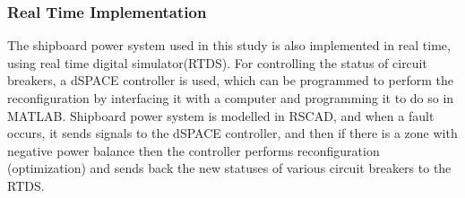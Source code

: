 \subsubsection{Real Time Implementation}
The shipboard power system used in this study is also implemented in real time, using real time digital simulator(RTDS). For controlling the status of circuit breakers, a dSPACE controller is used, which can be programmed to perform the reconfiguration by interfacing it with a computer and programming it to do so in MATLAB. Shipboard power system is modelled in RSCAD, and when a fault occurs, it sends signals to the dSPACE controller, and then if there is a zone with negative power balance then the controller performs reconfiguration (optimization) and sends back the new statuses of various circuit breakers to the RTDS.




